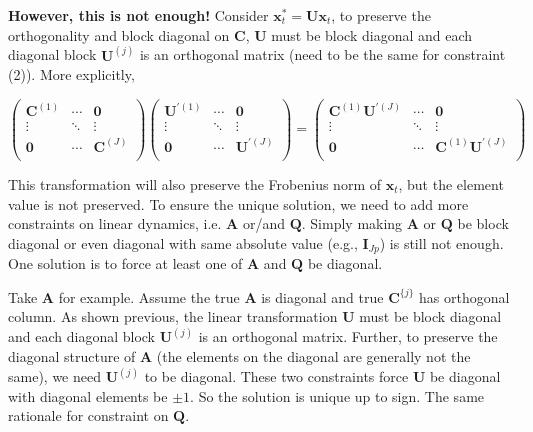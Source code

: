 \documentclass[]{article}
\begin{document}
\textbf{However, this is not enough!} Consider \(\mathbf{x}_{t}^{*} = \mathbf{Ux}_{t}\), to
preserve the orthogonality and block diagonal on \(\mathbf{C}\), \(\mathbf{U}\) must be
block diagonal and each diagonal block \(\mathbf{U}^{(j)}\) is an orthogonal matrix (need to be the same for constraint (2)). More explicitly,

\[\begin{pmatrix}
	\mathbf{C}^{(1)} & \cdots & \mathbf{0} \\
	\vdots & \ddots & \vdots \\
	\mathbf{0} & \cdots & \mathbf{C}^{(J)} \\
\end{pmatrix}\begin{pmatrix}
	\mathbf{U}^{'(1)} & \cdots & \mathbf{0} \\
	\vdots & \ddots & \vdots \\
	\mathbf{0} & \cdots & \mathbf{U}^{'(J)} \\
\end{pmatrix} = \begin{pmatrix}
	\mathbf{C}^{(1)}\mathbf{U}^{'(J)} & \cdots & \mathbf{0} \\
	\vdots & \ddots & \vdots \\
	\mathbf{0} & \cdots & \mathbf{C}^{(1)}\mathbf{U}^{'(J)} \\
\end{pmatrix}\]

This transformation will also preserve the Frobenius norm of \(\mathbf{x}_{t}\),
but the element value is not preserved. To ensure the unique solution,
we need to add more constraints on linear dynamics, i.e. \(\mathbf{A}\) or/and
\(\mathbf{Q}\). Simply making \(\mathbf{A}\) or \(\mathbf{Q}\) be block diagonal or even diagonal
with same absolute value (e.g., \(\mathbf{I}_{Jp}\)) is still not enough. One solution is to force at least one of \(\mathbf{A}\) and \(\mathbf{Q}\) be diagonal.

Take \(\mathbf{A}\) for example. Assume the true \(\mathbf{A}\) is diagonal and true
\(\mathbf{C}^{\{ j\}}\) has orthogonal column. As shown previous, the linear transformation \(\mathbf{U}\) must be block diagonal and each diagonal block
\(\mathbf{U}^{(j)}\) is an orthogonal matrix. Further, to preserve the diagonal
structure of \(\mathbf{A}\) (the elements on the diagonal are generally not the
same), we need \(\mathbf{U}^{(j)}\) to be diagonal. These two constraints force
\(\mathbf{U}\) be diagonal with diagonal elements be \(\pm 1\). So the solution
is unique up to sign. The same rationale for constraint on \(\mathbf{Q}\).
\end{document}
